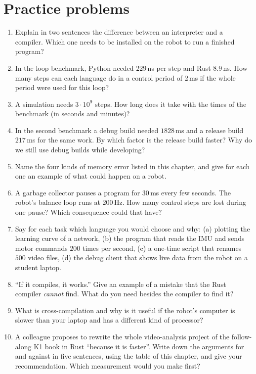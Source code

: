 \section*{Practice problems}
\begin{enumerate}[label=\textbf{\thechapter.\arabic*}]
  \item Explain in two sentences the difference between an interpreter and a compiler. Which one needs to be installed on the robot to run a finished program?
  \item In the loop benchmark, Python needed $229$\,ns per step and Rust $8.9$\,ns. How many steps can each language do in a control period of $2$\,ms if the whole period were used for this loop?
  \item A simulation needs $3\cdot10^{9}$ steps. How long does it take with the times of the benchmark (in seconds and minutes)?
  \item In the second benchmark a debug build needed $1828$\,ms and a release build $217$\,ms for the same work. By which factor is the release build faster? Why do we still use debug builds while developing?
  \item Name the four kinds of memory error listed in this chapter, and give for each one an example of what could happen on a robot.
  \item A garbage collector pauses a program for $30$\,ms every few seconds. The robot's balance loop runs at $200$\,Hz. How many control steps are lost during one pause? Which consequence could that have?
  \item Say for each task which language you would choose and why: (a) plotting the learning curve of a network, (b) the program that reads the IMU and sends motor commands $200$ times per second, (c) a one-time script that renames $500$ video files, (d) the debug client that shows live data from the robot on a student laptop.
  \item ``If it compiles, it works.'' Give an example of a mistake that the Rust compiler \emph{cannot} find. What do you need besides the compiler to find it?
  \item What is cross-compilation and why is it useful if the robot's computer is slower than your laptop and has a different kind of processor?
  \item[\textbf{\thechapter.10}$\star$] A colleague proposes to rewrite the whole video-analysis project of the follow-along K1 book in Rust ``because it is faster''. Write down the arguments for and against in five sentences, using the table of this chapter, and give your recommendation. Which measurement would you make first?
\end{enumerate}
